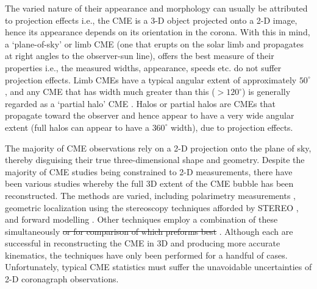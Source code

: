 The varied nature of their appearance and morphology can usually be attributed to projection effects \citep{burk2004} i.e., the CME is a 3-D object projected onto a 2-D image, hence its appearance depends on its orientation in the corona. With this in mind, a `plane-of-sky' or limb CME (one that erupts on the solar limb and propagates at right angles to the observer-sun line), offers the best measure of their properties i.e., the measured widths, appearance, speeds etc. do not suffer projection effects. Limb CMEs have a typical angular extent of approximately $50^{\circ}$ \citep{burk2004}, and any CME that has width much greater than this ($>120^{\circ}$) is generally regarded as a `partial halo' CME \citep{yashiro2004}. Halos or partial halos are CMEs that propagate toward the observer and hence appear to have a very wide angular extent (full halos can appear to have a $360^{\circ}$ width), due to projection effects. 



The majority of CME observations rely on a 2-D projection onto the plane of sky, thereby disguising their true three-dimensional shape and geometry. Despite the majority of CME studies being constrained to 2-D measurements, there have been various studies whereby the full 3D extent of the CME bubble has been reconstructed. The methods are varied, including polarimetry measurements \citep{moran2004}, geometric localization using the stereoscopy techniques afforded by STEREO \citep{dekon2009, byrne2010}, and forward modelling \citep{thern2006}. Other techniques employ a combination of these simultaneously \st{or for comparison of which preforms best} \citep{mierla2009}. Although each are successful in reconstructing the CME in 3D and producing more accurate kinematics, the techniques have only been performed for a handful of cases. Unfortunately, typical CME statistics must suffer the unavoidable uncertainties of 2-D coronagraph observations.

